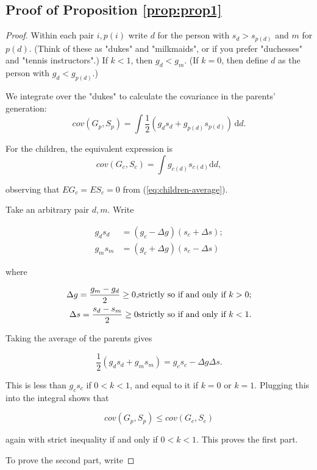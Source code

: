 \documentclass[
]{article}
\begin{document}
\hypertarget{proof-of-proposition-refpropprop1}{%
\subsection{Proof of Proposition \ref{prop:prop1}}\label{proof-of-proposition-refpropprop1}}

\begin{proof}


Within each pair $i,p(i)$ write $d$ for the person with $s_{d}>s_{p(d)}$
and $m$ for $p(d)$. (Think of these as "dukes" and "milkmaids",
or if you prefer "duchesses" and "tennis instructors".) If
$k < 1$, then $g_{d} < g_{m}$. (If $k = 0$, then define $d$ as the person
with $g_{d} < g_{p(d)}$.)

We integrate over the "dukes" to calculate the covariance in the
parents' generation:
\[
cov(G_{p},S_{p})=\int\frac{1}{2}(g_{d}s_{d}+g_{p(d)}s_{p(d)})\,\mathrm{d}d.
\]

For the children, the equivalent expression is
\[
cov(G_{c},S_{c})=\int g_{c(d)}s_{c(d)}\mathrm{d}d,
\]

observing that $EG_{c} = ES_{c}=0$ from (\ref{eq:children-average}).

Take an arbitrary pair $d,m$. Write

\begin{align*}
g_{d}s_{d} & = (g_{c}-\Delta g)(s_{c}+\Delta s);\\
g_{m}s_{m} & = (g_{c}+\Delta g)(s_{c}-\Delta s)
\end{align*}

where 

\begin{align*}
\text{\ensuremath{\Delta g=\frac{g_{m}-g_{d}}{2}\ge0}}, & \textrm{strictly so if and only if }k>0;\\
\Delta s=\frac{s_{d}-s_{m}}{2}\ge0 & \textrm{strictly so if and only if }k<1.
\end{align*}

Taking the average of the parents gives

\[
\frac{1}{2}(g_{d}s_{d}+g_{m}s_{m})= g _{c}s_{c}-\Delta g\Delta s.
\]

This is less than $g_{c}s_{c}$ if $0 < k < 1$, and equal to it if $k = 0$
or $k = 1$. Plugging this into the integral shows that 

\[
cov(G_{p},S_{p})\le cov(G_{c},S_{c})
\]

again with strict inequality if and only if $0 < k < 1$. This proves the first
part. 

To prove the second part, write


\end{proof}
\end{document}
